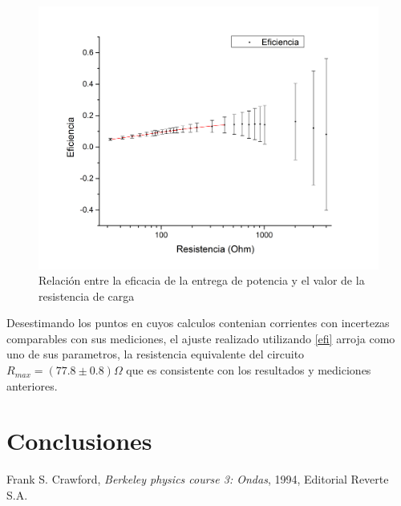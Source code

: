 \documentclass[11pt,a4paper]{article}
\begin{document}
\begin{figure}[h]
  \centering
  \includegraphics[scale=0.45]{Eficiencia_vs_Resistencia}
  \caption{Relación entre la eficacia de la entrega de potencia y el valor de la resistencia de carga}
  \label{fig:efi_res}
\end{figure}

Desestimando los puntos en cuyos calculos contenian corrientes con incertezas comparables con sus mediciones, el ajuste realizado utilizando \eqref{efi} arroja como uno de sus parametros, la resistencia equivalente del circuito $R_{max} = (77.8 \pm 0.8)\Omega$ que es consistente con los resultados y mediciones anteriores.




\section{Conclusiones}
\label{sec:conclusiones}








\begin{thebibliography}{1}
  Frank S. Crawford, \textit{Berkeley physics course 3: Ondas}, 1994, Editorial Reverte S.A.
\end{thebibliography}
 
\end{document}

